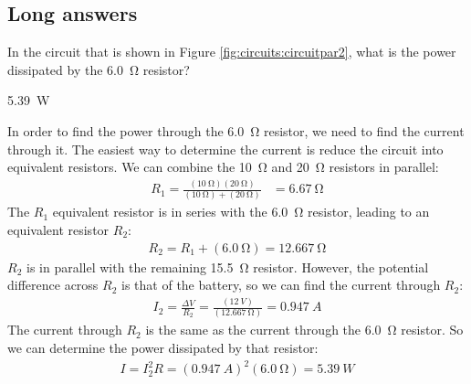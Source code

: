 %
%
\subsection{Long answers}
\question In the circuit that is shown in Figure \ref{fig:circuits:circuitpar2}, what is the power dissipated by the \SI{6.0}{\ohm} resistor?
\begin{finalanswer}
\SI{5.39}{W}
\end{finalanswer}
\begin{solution}
In order to find the power through the \SI{6.0}{\ohm} resistor, we need to find the current through it. The easiest way to determine the current is reduce the circuit into equivalent resistors. We can combine the \SI{10}{\ohm} and \SI{20}{\ohm} resistors in parallel:
\begin{align*}
R_1=\frac{(\SI{10}{\ohm})(\SI{20}{\ohm})}{(\SI{10}{\ohm})+(\SI{20}{\ohm})}&=\SI{6.67}{\ohm}
\end{align*}
The $R_1$ equivalent resistor is in series with the \SI{6.0}{\ohm} resistor, leading to an equivalent resistor $R_2$:
\begin{align*}
R_2=R_1+(\SI{6.0}{\ohm})=\SI{12.667}{\ohm}
\end{align*}
$R_2$ is in parallel with the remaining \SI{15.5}{\ohm} resistor. However, the potential difference across $R_2$ is that of the battery, so we can find the current through $R_2$:
\begin{align*}
I_2=\frac{\Delta V}{R_2}=\frac{(\SI{12}{V})}{(\SI{12.667}{\ohm})}=\SI{0.947}{A}
\end{align*}
The current through $R_2$ is the same as the current through the \SI{6.0}{\ohm} resistor. So we can determine the power dissipated by that resistor:
\begin{align*}
I=I_2^2R=(\SI{0.947}{A})^2(\SI{6.0}{\ohm})=\SI{5.39}{W}
\end{align*}
\end{solution}

